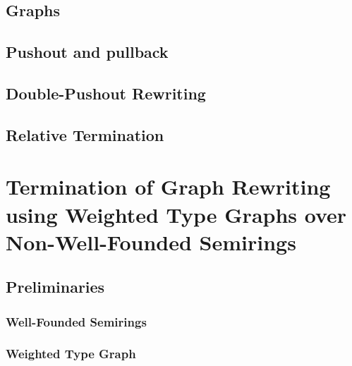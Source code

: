 \documentclass{report}
\begin{document}

\section{Graphs}
 
\section{Pushout and pullback}  

\section{Double-Pushout Rewriting}
\label{sec:dpo}
 
\section{Relative Termination}



\chapter{Termination of Graph Rewriting using Weighted Type Graphs over Non-Well-Founded Semirings} 
\label{chap:nwf}



\section{Preliminaries}

\subsection{Well-Founded Semirings} 
\label{sec:well_founded_semiring}

 
\subsection{Weighted Type Graph} 
\label{sec:weighted_type_graph}

\end{document}

